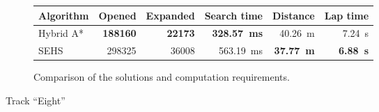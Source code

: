 \begin{figure}[!tbp]
	\vspace{0.75cm}

	\begin{subfigure}[t]{\textwidth}
		\centering
		\begin{tabular}{l r r r r r}%
			\toprule
			Algorithm & Opened & Expanded & Search time & Distance & Lap time \\
			\midrule
			Hybrid A* & \textbf{\num{188160}} & \textbf{\num{22173}} & \textbf{\SI{328.57}{\milli\second}} & \SI{40.26}{\meter} & \SI{7.24}{\second} \\
			SEHS & \num{298325} & \num{36008} & \SI{563.19}{\milli\second} & \textbf{\SI{37.77}{\meter}} & \textbf{\SI{6.88}{\second}} \\
			\bottomrule
		\end{tabular}
		\caption{Comparison of the solutions and computation requirements.}
		\label{table:eight}
	\end{subfigure}

	\vspace{0.75cm}

	\caption{Track ``Eight''}
\end{figure}


